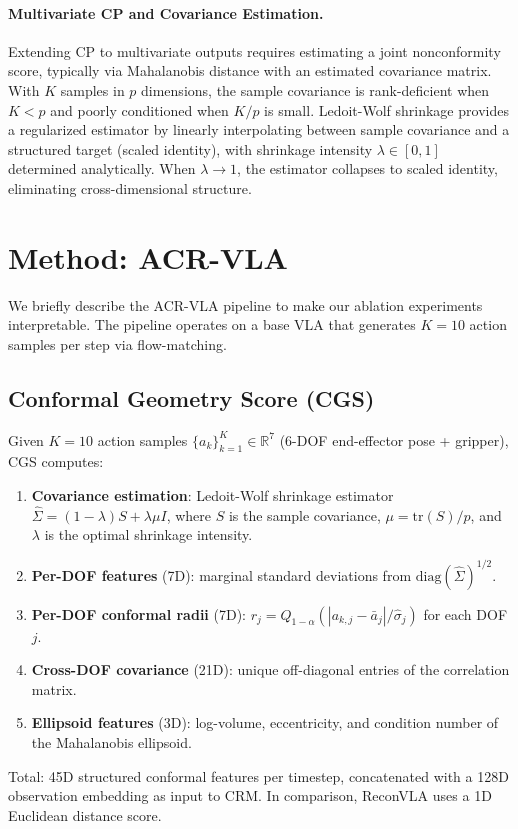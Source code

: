 \documentclass[letterpaper]{article}
\begin{document}
\paragraph{Multivariate CP and Covariance Estimation.}
Extending CP to multivariate outputs requires estimating a joint nonconformity score, typically via Mahalanobis distance with an estimated covariance matrix. With $K$ samples in $p$ dimensions, the sample covariance is rank-deficient when $K < p$ and poorly conditioned when $K/p$ is small. Ledoit-Wolf shrinkage provides a regularized estimator by linearly interpolating between sample covariance and a structured target (scaled identity), with shrinkage intensity $\lambda \in [0,1]$ determined analytically. When $\lambda \to 1$, the estimator collapses to scaled identity, eliminating cross-dimensional structure.

\section{Method: ACR-VLA}
\label{sec:method}

We briefly describe the ACR-VLA pipeline to make our ablation experiments interpretable. The pipeline operates on a base VLA that generates $K{=}10$ action samples per step via flow-matching.

\subsection{Conformal Geometry Score (CGS)}

Given $K{=}10$ action samples $\{a_k\}_{k=1}^{K} \in \mathbb{R}^{7}$ (6-DOF end-effector pose + gripper), CGS computes:
\begin{enumerate}[nosep]
\item \textbf{Covariance estimation}: Ledoit-Wolf shrinkage estimator $\hat{\Sigma} = (1-\lambda)S + \lambda \mu I$, where $S$ is the sample covariance, $\mu = \mathrm{tr}(S)/p$, and $\lambda$ is the optimal shrinkage intensity.
\item \textbf{Per-DOF features} (7D): marginal standard deviations from $\mathrm{diag}(\hat{\Sigma})^{1/2}$.
\item \textbf{Per-DOF conformal radii} (7D): $r_j = Q_{1-\alpha}(|a_{k,j} - \bar{a}_j| / \hat{\sigma}_j)$ for each DOF $j$.
\item \textbf{Cross-DOF covariance} (21D): unique off-diagonal entries of the correlation matrix.
\item \textbf{Ellipsoid features} (3D): log-volume, eccentricity, and condition number of the Mahalanobis ellipsoid.
\end{enumerate}
Total: 45D structured conformal features per timestep, concatenated with a 128D observation embedding as input to CRM. In comparison, ReconVLA uses a 1D Euclidean distance score.
\end{document}
